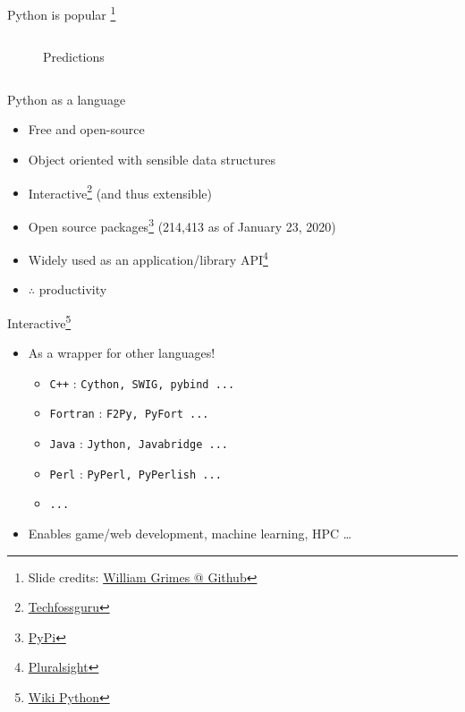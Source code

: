 \documentclass[presentation]{beamer}
\begin{document}
\begin{frame}[label={sec:org3ef598c}]{Python is popular \footnote{Slide credits: \href{https://github.com/williamgrimes/teach\_python\_in\_notebooks/blob/master/python\_course.pdf}{William Grimes @ Github}}}
\begin{columns}
\begin{column}{0.65\columnwidth}
\begin{figure}[htbp]
\caption{Predictions}
\end{figure}
\end{column}
\end{columns}
\end{frame}

\begin{frame}[label={sec:orgf73f654}]{Python as a language}
\begin{itemize}
\item Free and open-source
\item Object oriented with sensible data structures
\item Interactive\footnote{\href{https://techfossguru.com/python-machine-learning-and-deep-learning/}{Techfossguru}} (and thus extensible)
\item Open source packages\footnote{\href{https://pypi.org/}{PyPi}} (214,413 as of January 23, 2020)
\item Widely used as an application/library API\footnote{\href{https://www.pluralsight.com/blog/software-development/why-python}{Pluralsight}}
\item \(\therefore\) productivity
\end{itemize}
\end{frame}

\begin{frame}[label={sec:org4c6f4bc},fragile]{Interactive\footnote{\href{https://wiki.python.org/moin/IntegratingPythonWithOtherLanguages}{Wiki Python}}}
 \begin{itemize}
\item As a wrapper for other languages!
\begin{itemize}
\item \texttt{C++} : \texttt{Cython, SWIG, pybind ...}
\item \texttt{Fortran} : \texttt{F2Py, PyFort ...}
\item \texttt{Java} : \texttt{Jython, Javabridge ...}
\item \texttt{Perl} : \texttt{PyPerl, PyPerlish ...}
\item \texttt{...}
\end{itemize}
\item Enables game/web development, machine learning,
HPC \ldots{}
\end{itemize}
\end{frame}
\end{document}
